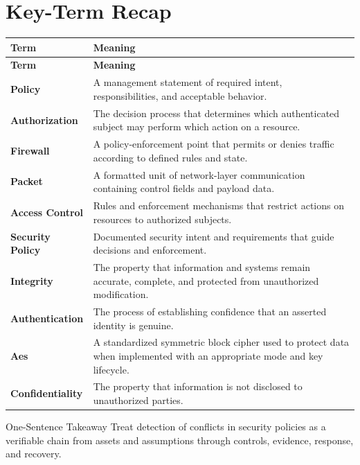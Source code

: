 \documentclass[11pt,letterpaper]{article}
\begin{document}
\section*{Key-Term Recap}
\begin{longtable}{>{\raggedright\arraybackslash}p{}>{\raggedright\arraybackslash}p{}}
\toprule\rowcolor{Navy}\color{white}\textbf{Term} & \color{white}\textbf{Meaning}\\\midrule
\endfirsthead
\toprule\rowcolor{Navy}\color{white}\textbf{Term} & \color{white}\textbf{Meaning}\\\midrule
\endhead
\textbf{Policy} & A management statement of required intent, responsibilities, and acceptable behavior. \\\midrule
\textbf{Authorization} & The decision process that determines which authenticated subject may perform which action on a resource. \\\midrule
\textbf{Firewall} & A policy-enforcement point that permits or denies traffic according to defined rules and state. \\\midrule
\textbf{Packet} & A formatted unit of network-layer communication containing control fields and payload data. \\\midrule
\textbf{Access Control} & Rules and enforcement mechanisms that restrict actions on resources to authorized subjects. \\\midrule
\textbf{Security Policy} & Documented security intent and requirements that guide decisions and enforcement. \\\midrule
\textbf{Integrity} & The property that information and systems remain accurate, complete, and protected from unauthorized modification. \\\midrule
\textbf{Authentication} & The process of establishing confidence that an asserted identity is genuine. \\\midrule
\textbf{Aes} & A standardized symmetric block cipher used to protect data when implemented with an appropriate mode and key lifecycle. \\\midrule
\textbf{Confidentiality} & The property that information is not disclosed to unauthorized parties. \\\midrule
\bottomrule
\end{longtable}
\begin{CornellExamBox}{One-Sentence Takeaway}
Treat detection of conflicts in security policies as a verifiable chain from assets and assumptions through controls, evidence, response, and recovery.
\end{CornellExamBox}
\end{document}
